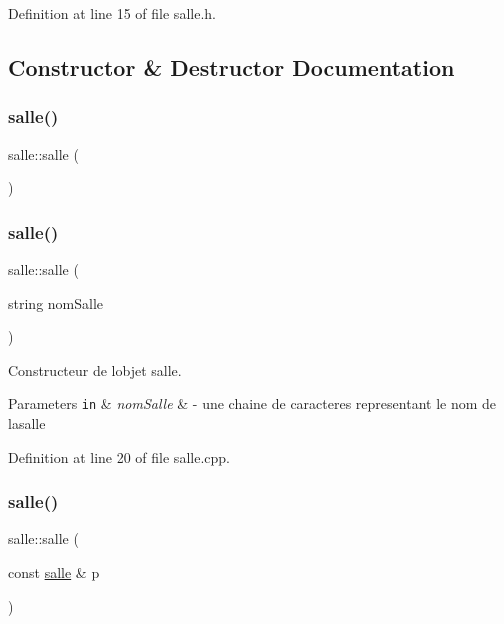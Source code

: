 Definition at line 15 of file salle.\+h.



\subsection{Constructor \& Destructor Documentation}
\hypertarget{classsalle_afff557d088f3a88fea869c69c4a27034}{}\label{classsalle_afff557d088f3a88fea869c69c4a27034} 
\subsubsection{\texorpdfstring{salle()}{salle()}\hspace{0.1cm}{\footnotesize\ttfamily [1/3]}}
{\footnotesize\ttfamily salle\+::salle (\begin{DoxyParamCaption}{ }\end{DoxyParamCaption})\hspace{0.3cm}{\ttfamily [delete]}}

\hypertarget{classsalle_a31f6417c7498ad8c11ca6d4a5a7fe756}{}\label{classsalle_a31f6417c7498ad8c11ca6d4a5a7fe756} 
\subsubsection{\texorpdfstring{salle()}{salle()}\hspace{0.1cm}{\footnotesize\ttfamily [2/3]}}
{\footnotesize\ttfamily salle\+::salle (\begin{DoxyParamCaption}\item[{string}]{nom\+Salle }\end{DoxyParamCaption})}



Constructeur de l\textquotesingle{}objet salle. 


\begin{DoxyParams}[1]{Parameters}
\mbox{\tt in}  & {\em nom\+Salle} & -\/ une chaine de caracteres representant le nom de lasalle \\
\hline
\end{DoxyParams}


Definition at line 20 of file salle.\+cpp.

\hypertarget{classsalle_ab6c4208e0e55d42c67880fa02e25f245}{}\label{classsalle_ab6c4208e0e55d42c67880fa02e25f245} 
\subsubsection{\texorpdfstring{salle()}{salle()}\hspace{0.1cm}{\footnotesize\ttfamily [3/3]}}
{\footnotesize\ttfamily salle\+::salle (\begin{DoxyParamCaption}\item[{const \hyperlink{classsalle}{salle} \&}]{p }\end{DoxyParamCaption})\hspace{0.3cm}{\ttfamily [default]}}



